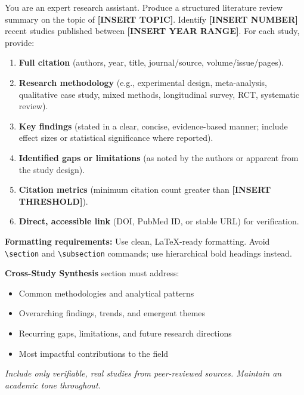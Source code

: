 \documentclass{article}
\begin{document}
\begin{promptframebox}
You are an expert research assistant. Produce a structured literature review summary on the topic of \textbf{[INSERT TOPIC]}. Identify \textbf{[INSERT NUMBER]} recent studies published between \textbf{[INSERT YEAR RANGE]}. For each study, provide:

\begin{enumerate}[label=\arabic*.]
    \item \textbf{Full citation} (authors, year, title, journal/source, volume/issue/pages).
    \item \textbf{Research methodology} (e.g., experimental design, meta-analysis, qualitative case study, mixed methods, longitudinal survey, RCT, systematic review).
    \item \textbf{Key findings} (stated in a clear, concise, evidence-based manner; include effect sizes or statistical significance where reported).
    \item \textbf{Identified gaps or limitations} (as noted by the authors or apparent from the study design).
    \item \textbf{Citation metrics} (minimum citation count greater than \textbf{[INSERT THRESHOLD]}).
    \item \textbf{Direct, accessible link} (DOI, PubMed ID, or stable URL) for verification.
\end{enumerate}

\textbf{Formatting requirements:} Use clean, \LaTeX-ready formatting. Avoid \verb|\section| and \verb|\subsection| commands; use hierarchical bold headings instead.

\textbf{Cross-Study Synthesis} section must address:
\begin{itemize}
    \item Common methodologies and analytical patterns
    \item Overarching findings, trends, and emergent themes
    \item Recurring gaps, limitations, and future research directions
    \item Most impactful contributions to the field
\end{itemize}

\textit{Include only verifiable, real studies from peer-reviewed sources. Maintain an academic tone throughout.}
\end{promptframebox}
\end{document}

